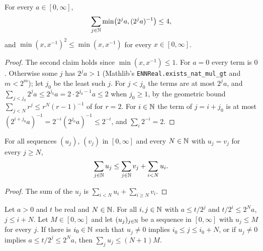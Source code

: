 \begin{lemma}
\label{lem:dyadic-min-sum}
\leanok
For every $a \in [0, \infty]$,
\[
  \sum_{j \in \mathbb{N}} \min\bigl(2^j a, (2^j a)^{-1}\bigr) \leq 4 ,
\]
and $\min(x, x^{-1})^2 \leq \min(x, x^{-1})$ for every $x \in [0, \infty]$.
\end{lemma}

\begin{proof}
\leanok
{}
The second claim holds since $\min(x, x^{-1}) \leq 1$. For $a = 0$ every term is $0$.
Otherwise some $j$ has $2^j a > 1$ (Mathlib's
\texttt{ENNReal.\allowbreak exists\_\allowbreak nat\_\allowbreak mul\_\allowbreak gt} and
$m < 2^m$); let $j_0$ be the least such $j$. For
$j < j_0$ the terms are at most $2^j a$, and
$\sum_{j < j_0} 2^j a \leq 2^{j_0} a = 2 \cdot 2^{j_0 - 1} a \leq 2$ when $j_0 \geq 1$, by
the geometric bound $\sum_{j < N} r^j \leq r^N (r - 1)^{-1}$ of 
for $r = 2$. For
$i \in \mathbb{N}$ the term of $j = i + j_0$ is at most
$(2^{i + j_0} a)^{-1} = 2^{-i} (2^{j_0} a)^{-1} \leq 2^{-i}$, and $\sum_i 2^{-i} = 2$.
\end{proof}

\begin{lemma}
\label{lem:tsum-changed-terms}
\leanok
For all sequences $(u_j)$, $(v_j)$ in $[0, \infty]$ and every $N \in \mathbb{N}$ with $u_j = v_j$ for
every $j \geq N$,
\[
  \sum_{j \in \mathbb{N}} u_j \leq \sum_{j \in \mathbb{N}} v_j + \sum_{i < N} u_i .
\]
\end{lemma}

\begin{proof}
\leanok
The sum of the $u_j$ is $\sum_{i < N} u_i + \sum_{i \geq N} v_i$.
\end{proof}

\begin{lemma}
\label{lem:dyadic-annulus-count}
\leanok
Let $a > 0$ and $t$ be real and $N \in \mathbb{N}$. For all $i, j \in \mathbb{N}$ with $a \leq t / 2^j$ and
$t / 2^i \leq 2^N a$, $j \leq i + N$. Let $M \in [0, \infty]$ and let $(u_j)_{j \in \mathbb{N}}$ be a
sequence in $[0, \infty]$ with $u_j \leq M$ for every $j$. If there is $i_0 \in \mathbb{N}$ such that
$u_j \neq 0$ implies $i_0 \leq j \leq i_0 + N$, or if $u_j \neq 0$ implies
$a \leq t / 2^j \leq 2^N a$, then $\sum_j u_j \leq (N + 1) M$.
\end{lemma}

